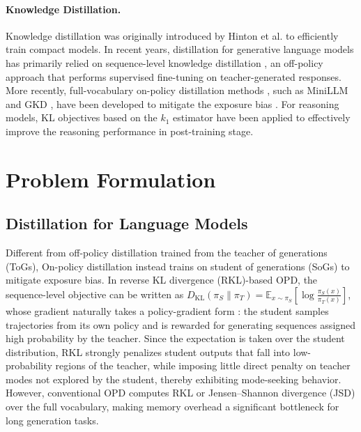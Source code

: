 \documentclass{article} %
\renewcommand{\cite}[1]{\citep{#1}}
\begin{document}
\paragraph{Knowledge Distillation.}
Knowledge distillation was originally introduced by Hinton et al. \cite{hinton2015distilling} to efficiently train compact models. In recent years, distillation for generative language models has primarily relied on sequence-level knowledge distillation \cite{kim2016sequence}, an off-policy approach that performs supervised fine-tuning on teacher-generated responses. More recently, full-vocabulary on-policy distillation methods \cite{ko2024distillm,ko2025distillm,xu2025speculative}, such as MiniLLM \cite{gu2024minillm} and GKD \cite{agarwal2024onpolicy}, have been developed to mitigate the exposure bias \cite{agarwal2024onpolicy}. For reasoning models, KL objectives based on the $k_1$ estimator \cite{lu2025onpolicy,yang2026learning} have been applied to effectively improve the reasoning performance in post-training stage.




\section{Problem Formulation}

\subsection{Distillation for Language Models}
Different from off-policy distillation trained from the teacher of generations (ToGs), 
On-policy distillation instead trains on student of generations (SoGs) to mitigate exposure bias. In reverse KL divergence (RKL)-based OPD, the sequence-level objective can be written as $D_{\mathrm{KL}}(\pi_S \| \pi_T) = \mathbb{E}_{x \sim \pi_S}\left[\log \frac{\pi_S(x)}{\pi_T(x)}\right]$, whose gradient naturally takes a policy-gradient form \cite{gu2024minillm}: the student samples trajectories from its own policy and is rewarded for generating sequences assigned high probability by the teacher. Since the expectation is taken over the student distribution, RKL strongly penalizes student outputs that fall into low-probability regions of the teacher, while imposing little direct penalty on teacher modes not explored by the student, thereby exhibiting mode-seeking behavior. 
However, conventional OPD computes RKL or Jensen--Shannon divergence (JSD) over the full vocabulary, making memory overhead a significant bottleneck for long generation tasks.
\end{document}
